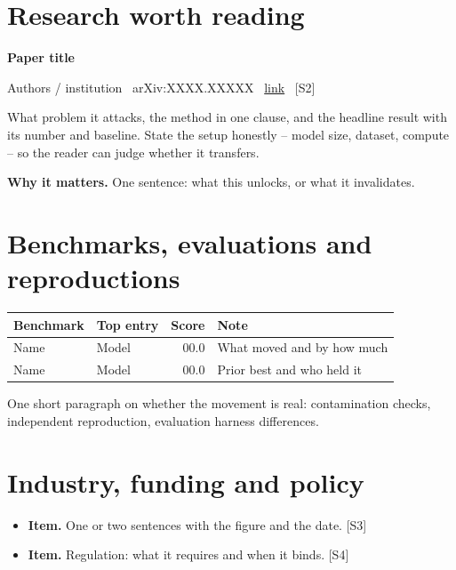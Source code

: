 \documentclass[11pt,a4paper]{article}
\newcommand{\entry}[4]{%
  \par\vspace{0.7em}%
  {\sffamily\bfseries\color{brandink}#1}\par
  {\footnotesize\color{brandgrey}#2 \textbullet\ \href{#3}{link} \textbullet\ \srcref{#4}}\par
  \vspace{0.15em}}
\newcommand{\why}[1]{\par{\small\textbf{Why it matters.} #1}\par}
\newcommand{\srcref}[1]{\textcolor{brandaccent}{[S#1]}}
\begin{document}
\section{Research worth reading}
\entry{Paper title}{Authors / institution \textbullet\ arXiv:XXXX.XXXXX}{https://arxiv.org/abs/XXXX.XXXXX}{2}
What problem it attacks, the method in one clause, and the headline result with its
number and baseline. State the setup honestly -- model size, dataset, compute --
so the reader can judge whether it transfers.
\why{One sentence: what this unlocks, or what it invalidates.}

\section{Benchmarks, evaluations and reproductions}
\begin{tabularx}{\textwidth}{@{}l l r X@{}}
\toprule
\textbf{Benchmark} & \textbf{Top entry} & \textbf{Score} & \textbf{Note} \\
\midrule
Name & Model & 00.0 & What moved and by how much \\
Name & Model & 00.0 & Prior best and who held it \\
\bottomrule
\end{tabularx}
\vspace{0.4em}

One short paragraph on whether the movement is real: contamination checks,
independent reproduction, evaluation harness differences.

\section{Industry, funding and policy}
\begin{itemize}
  \item \textbf{Item.} One or two sentences with the figure and the date. \srcref{3}
  \item \textbf{Item.} Regulation: what it requires and when it binds. \srcref{4}
\end{itemize}
\end{document}
